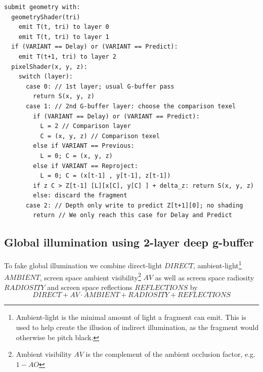 \documentclass{ACGSeminar}
\begin{document}
		\begin{algorithm} \label{alg:one_pass_strawman} \caption{An improved one-pass algorithm for generating 2-layer deep g-buffers}
		\begin{lstlisting}[frame=single]
submit geometry with:
  geometryShader(tri)
    emit T(t, tri) to layer 0
    emit T(t, tri) to layer 1
  if (VARIANT == Delay) or (VARIANT == Predict):
    emit T(t+1, tri) to layer 2
  pixelShader(x, y, z):
    switch (layer):
      case 0: // 1st layer; usual G-buffer pass
        return S(x, y, z)
      case 1: // 2nd G-buffer layer: choose the comparison texel
        if (VARIANT == Delay) or (VARIANT == Predict):
          L = 2 // Comparison layer
          C = (x, y, z) // Comparison texel
        else if VARIANT == Previous:
          L = 0; C = (x, y, z)
        else if VARIANT == Reproject:
          L = 0; C = (x[t-1] , y[t-1], z[t-1])
        if z C > Z[t-1] [L][x[C], y[C] ] + delta_z: return S(x, y, z)
        else: discard the fragment
      case 2: // Depth only write to predict Z[t+1][0]; no shading
        return // We only reach this case for Delay and Predict
		\end{lstlisting}
		\end{algorithm}
	\subsection{Global illumination using 2-layer deep g-buffer} 
		To fake global illumination we combine direct-light $DIRECT$, ambient-light\footnote{Ambient-light is the minimal amount of light a fragment can emit. This is used to help create the illusion of indirect illumination, as the fragment would otherwise be pitch black.} $AMBIENT$, screen space ambient visibility\footnote{Ambient visibility $AV$ is the complement of the ambient occlusion factor, e.g. $1-AO$} $AV$ as well as screen space radiosity $RADIOSITY$ and screen space reflections $REFLECTIONS$ by \cite{RSM} \cite{TSTMT}
		$$ DIRECT + AV \cdot AMBIENT + RADIOSITY + REFLECTIONS $$
		
\end{document}
